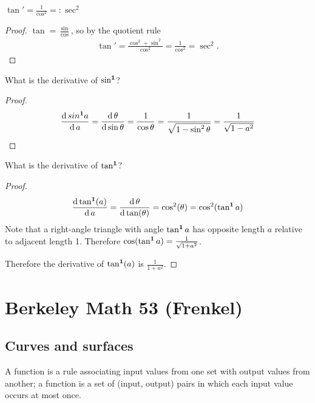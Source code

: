 \begin{claim*}
  $\tan' = \frac{1}{\cos^2} =: \sec^2$
\end{claim*}

\begin{proof}
  $\tan = \frac{\sin}{\cos}$, so by the quotient rule
  \begin{align*}
    \tan'
    = \frac{\cos^2 + \sin^2}{\cos^2}
    = \frac{1}{\cos^2}
    = \sec^2.
  \end{align*}
\end{proof}

\begin{claim*}
  What is the derivative of $\sin^{\mathbf 1}$?
\end{claim*}

\begin{proof}
  \begin{align*}
    \frac{\operatorname{\text{d}} sin^{\mathbf 1} a}{\operatorname{\text{d}} a}
    = \frac{\operatorname{\text{d}} \theta}{\operatorname{\text{d}} \sin \theta}
    = \frac{1}{\cos \theta}
    = \frac{1}{\sqrt{1 - \sin^2 \theta }}
    = \frac{1}{\sqrt{1 - a^2}}
  \end{align*}
\end{proof}


\begin{claim*}
  What is the derivative of $\tan^{\mathbf 1}$?
\end{claim*}

\begin{proof}
  \begin{align*}
    \frac{\operatorname{\text{d}} \tan^{\mathbf 1}(a)}{\operatorname{\text{d}} a}
    = \frac{\operatorname{\text{d}} \theta}{\operatorname{\text{d}} \tan(\theta)}
    = \cos^2(\theta)
    = \cos^2(\tan^{\mathbf 1} a)
  \end{align*}
  Note that a right-angle triangle with angle $\tan^{\mathbf 1} a$ has opposite length $a$ relative to
  adjacent length 1. Therefore $\cos(\tan^{\mathbf 1} a) = \frac{1}{\sqrt{1 + a^2}}$.

  Therefore the derivative of $\tan^{\mathbf 1}(a)$ is $\frac{1}{1 + a^2}$.
\end{proof}


\newpage
\section{Berkeley Math 53 (Frenkel)}
\subsection{Curves and surfaces}

A function is a rule associating input values from one set with output values
from another; a function is a set of (input, output) pairs in which each input
value occurs at most once.

